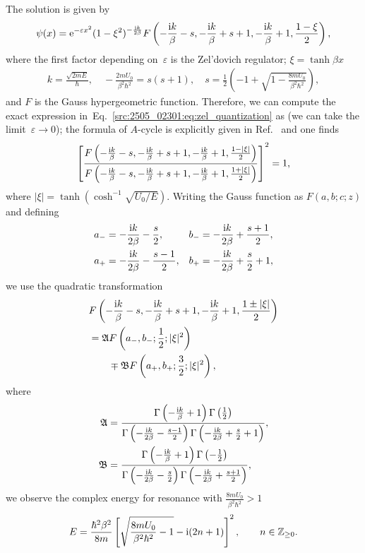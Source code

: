 The solution is given by
\begin{align}
    \psi(x) = \mathrm{e}^{-\varepsilon x^2}
    (1-\xi^2)^{-\frac{\mathrm{i} k}{2\beta}}
    F\left( -\frac{\mathrm{i} k}{\beta}-s, -\frac{\mathrm{i} k}{\beta}+s+1, -\frac{\mathrm{i} k}{\beta}+1, \frac{1-\xi}{2} \right) ,
 \label{src:2505_02301:eq:rm_sol}
\end{align}
where the first factor depending on~$\varepsilon$ is the Zel'dovich regulator;
$\xi = \tanh \beta x$
\begin{align}
    k = \frac{\sqrt{2mE}}{\hbar}, \quad
    -\frac{2mU_{0}}{\beta^2\hbar^2} = s(s+1), \quad
    s=\frac{1}{2}\left( -1+\sqrt{1-\frac{8mU_{0}}{\beta^2 \hbar^2}} \right) ,
\end{align}
and $F$ is the Gauss hypergeometric function.
Therefore, we can compute the exact expression in~Eq.~\eqref{src:2505_02301:eq:zel_quantization} as (we can take the limit~$\varepsilon\to0$); the formula of $A$-cycle is explicitly given in Ref.~\cite{Morikawa:2025grx} and one finds
\begin{align}
    \left[
    \frac{F\left( -\frac{\mathrm{i} k}{\beta}-s, -\frac{\mathrm{i} k}{\beta}+s+1, -\frac{\mathrm{i} k}{\beta}+1, \frac{1-|\xi|}{2} \right)}
    {F\left( -\frac{\mathrm{i} k}{\beta}-s, -\frac{\mathrm{i} k}{\beta}+s+1, -\frac{\mathrm{i} k}{\beta}+1, \frac{1+|\xi|}{2} \right)}
    \right]^2
    = 1 ,
    \label{src:2505_02301:eq:quant_cond_F}
\end{align}
where $|\xi|=\tanh(\cosh^{-1}\sqrt{U_0/E})$.
Writing the Gauss function as $F(a,b;c;z)$ and defining
\begin{align}
    a_-&=-\frac{\mathrm{i} k}{2\beta}-\frac{s}{2},
    &b_-&=-\frac{\mathrm{i} k}{2\beta}+\frac{s+1}{2},
    \notag\\
    a_+&=-\frac{\mathrm{i} k}{2\beta}-\frac{s-1}{2},
    &b_+&=-\frac{\mathrm{i} k}{2\beta}+\frac{s}{2}+1,
\end{align}
we use the quadratic transformation
\begin{align}
    &F\left( -\frac{\mathrm{i} k}{\beta}-s, -\frac{\mathrm{i} k}{\beta}+s+1, -\frac{\mathrm{i} k}{\beta}+1, \frac{1\pm|\xi|}{2} \right)\notag\\
    &= \mathfrak{A} F\left(a_-,b_-;\frac{1}{2};|\xi|^2\right)
    \notag\\
    &\qquad
    \mp \mathfrak{B} F\left(a_+,b_+;\frac{3}{2};|\xi|^2\right) ,
\end{align}
where
\begin{align}
    \mathfrak{A} &= \frac{\Gamma\left(-\frac{\mathrm{i} k}{\beta}+1\right)\Gamma\left(\frac{1}{2}\right)}
    {\Gamma\left(-\frac{\mathrm{i} k}{2\beta}-\frac{s-1}{2}\right)\Gamma\left(-\frac{\mathrm{i} k}{2\beta}+\frac{s}{2}+1\right)},
    \notag\\
    \mathfrak{B} &= \frac{\Gamma\left(-\frac{\mathrm{i} k}{\beta}+1\right)\Gamma\left(-\frac{1}{2}\right)}
    {\Gamma\left(-\frac{\mathrm{i} k}{2\beta}-\frac{s}{2}\right)\Gamma\left(-\frac{\mathrm{i} k}{2\beta}+\frac{s+1}{2}\right)} ,
\end{align}
we observe the complex energy for resonance with $\frac{8mU_{0}}{\beta^2 \hbar^2}>1$
\begin{align}
    E=\frac{\hbar^2 \beta^2}{8m}
    \left[\sqrt{\frac{8mU_{0}}{\beta^2 \hbar^2}-1}-\mathrm{i} (2n+1)\right]^2,
    \qquad n\in\mathbb{Z}_{\geq0}.
    \label{src:2505_02301:eq:res-ene}
\end{align}
